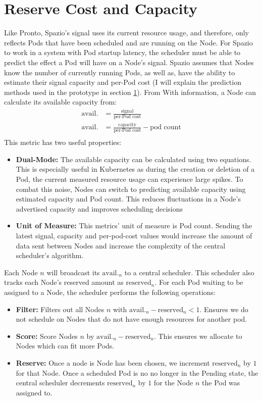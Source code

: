 \section{Reserve Cost and Capacity}
Like Pronto, Spazio's signal uses its current resource usage, and therefore, only
reflects Pods that have been scheduled and are running on the Node. For Spazio
to work in a system with Pod startup latency, the scheduler must be able to
predict the effect a Pod will have on a Node's signal. Spazio assumes that Nodes
know the number of currently running Pods, as well as, have the ability to
estimate their signal capacity and per-Pod cost (I will explain the prediction
methods used in the prototype in section \ref{}). From With information, a Node
can calculate its available capacity from:
\begin{align}
    \text{avail.} &= \frac{\text{signal}}{\text{per-Pod cost}} \\
    \text{avail.} &= \frac{\text{capacity}}{\text{per-Pod cost}} - \text{pod
    count}\\
\end{align}
This metric has two useful properties:
\begin{itemize}
    \item \textbf{Dual-Mode:} The available capacity can be calculated
        using two equations. This is especially useful in Kubernetes as during
        the creation or deletion of a Pod, the current measured resource usage
        can experience large spikes. To combat this noise, Nodes can switch to
        predicting available capacity using estimated capacity and Pod count.
        This reduces fluctuations in a Node's advertised capacity and improves
        scheduling decisions
    \item \textbf{Unit of Measure:} This metrics' unit of measure is Pod count.
        Sending the latest signal, capacity and per-pod-cost values would
        increase the amount of data sent between Nodes and increase the
        complexity of the central scheduler's algorithm.
\end{itemize}

Each Node $n$ will broadcast its $\text{avail.}_n$ to a central scheduler. This
scheduler also tracks each Node's reserved amount as $\text{reserved}_n$. For
each Pod waiting to be assigned to a Node, the scheduler performs the following
operations:
\begin{itemize}
    \item \textbf{Filter:} Filters out all Nodes $n$ with $\text{avail.}_n -
        \text{reserved}_n < 1$. Ensures we do not schedule on Nodes that do not
        have enough resources for another pod.
    \item \textbf{Score:} Score Nodes $n$ by $\text{avail.}_n -
        \text{reserved}_n$. This ensures we allocate to Nodes which can fit more
        Pods.
    \item \textbf{Reserve:} Once a node is Node has been chosen, we increment
        $\text{reserved}_n$ by $1$ for that Node. Once a scheduled Pod is no
        no longer in the Pending state, the central scheduler decrements
        $\text{reserved}_n$ by $1$ for the Node $n$ the Pod was assigned to.
\end{itemize}

